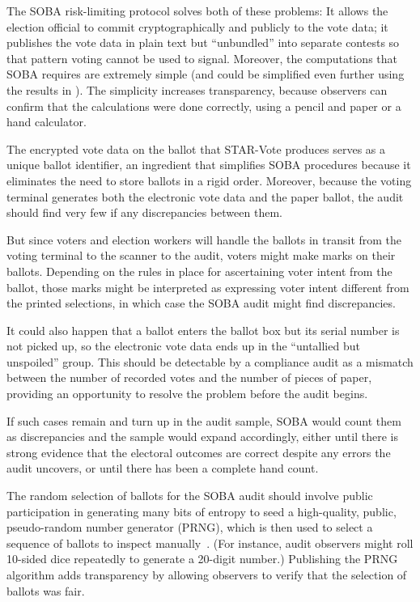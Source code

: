\documentclass[letterpaper, 10pt, twocolumn]{article}
\newcommand{\projname}{STAR-Vote\xspace}
\begin{document}
The SOBA risk-limiting protocol \cite{benalohEtal11} solves both of these problems:
It allows the election official to commit cryptographically and publicly to the vote data; it publishes
the vote data in plain text but ``unbundled'' into separate contests so that pattern voting cannot
be used to signal.
Moreover, the computations that SOBA requires are extremely simple (and could be simplified
even further using the results in \cite{lindemanStark12}).
The simplicity increases transparency, because observers can confirm that the calculations
were done correctly, using a pencil and paper or a hand calculator.

The encrypted vote data on the ballot that \projname produces serves as a unique ballot identifier,
an ingredient that simplifies SOBA procedures because it eliminates the need to store ballots in a rigid order.
Moreover, because the voting terminal generates both the electronic vote data and the paper ballot, 
the audit should find very few if any discrepancies between them.

But since voters and election workers will handle the ballots in transit from the voting terminal 
to the scanner to the audit, voters might make marks on their ballots.
Depending on the rules in place for ascertaining voter intent from the ballot,
those marks might be interpreted as expressing voter intent different from the
printed selections, in which case the SOBA audit might find discrepancies.

It could also happen that a ballot enters the ballot box but its serial number is not
picked up, so the electronic vote data ends up in the ``untallied but unspoiled'' group.
This should be detectable by a compliance audit \cite{benalohEtal11,lindemanStark12,starkWagner12} 
as a mismatch between the number of recorded votes and the number of pieces of paper,
providing an opportunity to resolve the problem before the audit begins.

If such cases remain and turn up in the audit sample, SOBA would count them as discrepancies 
and the sample would expand accordingly, either
until there is strong evidence that the electoral outcomes are correct despite any errors the audit
uncovers, or until there has been a complete hand count.

The random selection of ballots for the SOBA audit should involve public participation in
generating many bits of entropy to seed a high-quality, public, pseudo-random 
number generator (PRNG), which is then used to select a sequence of
ballots to inspect manually~\cite{lindemanStark12}.
(For instance, audit observers might roll 10-sided dice repeatedly to generate a 20-digit number.)
Publishing the PRNG algorithm adds transparency by allowing observers to verify
that the selection of ballots was fair.
\end{document}
